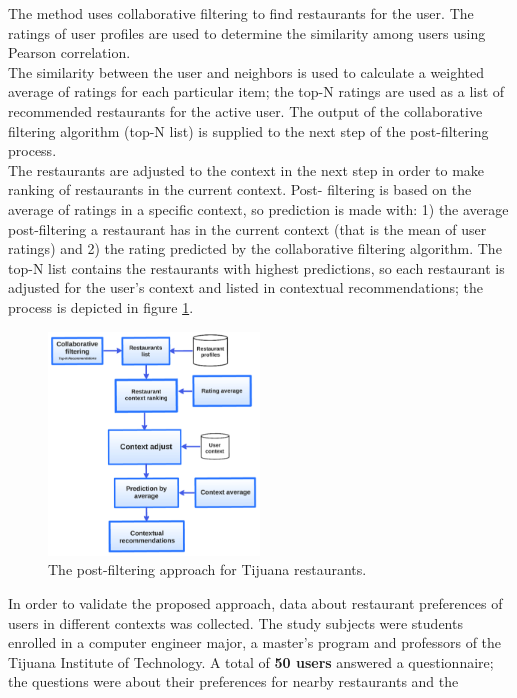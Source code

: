 The method
uses collaborative filtering to find restaurants for the
user\cite{ramirez2013restaurant}. The ratings of user profiles are
used to determine the similarity among users using Pearson correlation.\\   
The similarity between the user and  neighbors is used to calculate a
weighted average of ratings for each particular item;  the top-N
ratings are used as a list of recommended restaurants for the active
user. The output of the collaborative filtering algorithm (top-N list)
is supplied to the next step of the post-filtering process. \\   The
restaurants are adjusted to the context in the next step in order to
make ranking of restaurants in the current context. Post- filtering is
based on the average of ratings in a specific context, so prediction
is made with: 1) the average post-filtering a restaurant has in the
current context (that is the mean of user ratings) and 2) the rating
predicted by the collaborative filtering algorithm. The top-N list
contains the restaurants with highest predictions, so each restaurant
is adjusted for the user’s context and listed in contextual
recommendations; the process is depicted in figure
\ref{fig:postfiltering}.
\begin{figure}
\centering
\captionsetup{font=footnotesize}
\setlength\fboxsep{0pt}
\includegraphics[width=0.50\textwidth]{img/posfil.png}
\caption{The post-filtering approach for Tijuana restaurants.}
\label{fig:postfiltering}     
\end{figure}
In order to validate the proposed approach, data about restaurant
preferences of users in different contexts was collected. The study
subjects were students enrolled in a computer engineer major, a
master’s program and professors of the Tijuana Institute of
Technology. A total of \textbf{50 users} answered a questionnaire; the
questions were about their preferences for nearby restaurants and the
